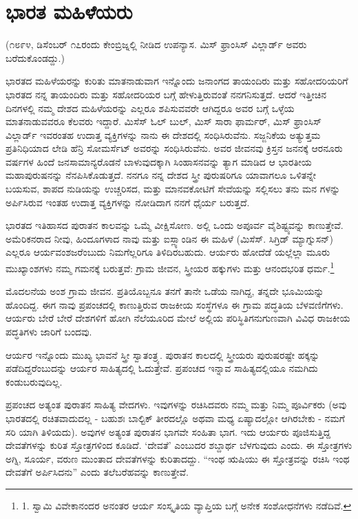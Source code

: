 
\chapter{ಭಾರತ ಮಹಿಳೆಯರು}

(೧೮೯೪, ಡಿಸೆಂಬರ್ ೧೭ರಂದು ಕೇಂಬ್ರಿಜ್ನಲ್ಲಿ ನೀಡಿದ ಉಪನ್ಯಾಸ. ಮಿಸ್ ಫ್ರಾಂಸಿಸ್ ವಿಲ್ಲಾರ್ಡ್ ಅವರು ಬರೆದುಕೊಂಡದ್ದು.)

ಭಾರತದ ಮಹಿಳೆಯರನ್ನು ಕುರಿತು ಮಾತನಾಡುವಾಗ ಇನ್ನೊಂದು ಜನಾಂಗದ ತಾಯಂದಿರು ಮತ್ತು ಸಹೋದರಿಯರಿಗೆ ಭಾರತದ ನನ್ನ ತಾಯಂದಿರು ಮತ್ತು ಸಹೋದರಿಯರ ಬಗ್ಗೆ ಹೇಳುತ್ತಿರುವಂತೆ ನನಗನಿಸುತ್ತದೆ. ಆದರೆ ಇತ್ತೀಚಿನ ದಿನಗಳಲ್ಲಿ ನಮ್ಮ ದೇಶದ ಮಹಿಳೆಯರನ್ನು ಎಲ್ಲರೂ ಶಪಿಸುವವರೇ ಆಗಿದ್ದರೂ ಅವರ ಬಗ್ಗೆ ಒಳ್ಳೆಯ ಮಾತನಾಡುವವರೂ ಕೆಲವರು ಇದ್ದಾರೆ. ಮಿಸೆಸ್ ಓಲ್ ಬುಲ್, ಮಿಸ್ ಸಾರಾ ಫಾರ್ಮರ್, ಮಿಸ್ ಫ್ರಾಂಸಿಸ್ ವಿಲ್ಲಾರ್ಡ್ ಇವರಂತಹ ಉದಾತ್ತ ವ್ಯಕ್ತಿಗಳನ್ನು ನಾನು ಈ ದೇಶದಲ್ಲಿ ಸಂಧಿಸಿರುವೆನು. ಸಜ್ಜನಿಕೆಯ ಅತ್ಯುತ್ತಮ ಪ್ರತಿನಿಧಿಯಾದ ಲೇಡಿ ಹೆನ್ರಿ ಸೋಮರ್ಸೆಟ್ ಅವರನ್ನು ಸಂಧಿಸಿರುವೆನು. ಅವರ ಜೀವನವು ಕ್ರಿಸ್ತನ ಜನನಕ್ಕೆ ಆರನೂರು ವರ್ಷಗಳ ಹಿಂದೆ ಜನಸಾಮಾನ್ಯರೊಡನೆ ಬಾಳುವುದಕ್ಕಾಗಿ ಸಿಂಹಾಸನವನ್ನು ತ್ಯಾಗ ಮಾಡಿದ ಆ ಭಾರತೀಯ ಮಹಾಪುರುಷನನ್ನು ನೆನಪಿಸಿಕೊಡುತ್ತದೆ. ನನಗೂ ನನ್ನ ದೇಶದ ಸ್ತ್ರೀ ಪುರುಷರಿಗೂ ಯಾವಾಗಲೂ ಒಳಿತನ್ನೇ ಬಯಸುವ, ಶಾಪದ ನುಡಿಯನ್ನು ಉಚ್ಚರಿಸದ, ಮತ್ತು ಮಾನವಕೋಟಿಗೆ ಸೇವೆಯನ್ನು ಸಲ್ಲಿಸಲು ತನು ಮನ ಗಳನ್ನು ಅರ್ಪಿಸಿರುವ ಇಂತಹ ಉದಾತ್ತ ವ್ಯಕ್ತಿಗಳನ್ನು ನೋಡಿದಾಗ ನನಗೆ ಧೈರ್ಯ ಬರುತ್ತದೆ.

ಭಾರತದ ಇತಿಹಾಸದ ಪುರಾತನ ಕಾಲವನ್ನು ಒಮ್ಮೆ ವೀಕ್ಷಿಸೋಣ. ಅಲ್ಲಿ ಒಂದು ಅಪೂರ್ವ ವೈಶಿಷ್ಟ್ಯವನ್ನು ಕಾಣುತ್ತೇವೆ. ಅಮೆರಿಕನರಾದ ನೀವು, ಹಿಂದೂಗಳಾದ ನಾವು ಮತ್ತು ಐಸ್ಲ್ಯಾಂಡಿನ ಈ ಮಹಿಳೆ (ಮಿಸೆಸ್. ಸಿಗ್ರಿಡ್ ಮ್ಯಾಗ್ನುಸನ್) ಎಲ್ಲರೂ ಆರ್ಯವಂಶಜರೆಂಬುದು ನಿಮಗೆಲ್ಲರಿಗೂ ತಿಳಿದಿರಬಹುದು. ಆರ್ಯರು ಹೋದೆಡೆ ಯಲ್ಲೆಲ್ಲಾ ಮೂರು ಮುಖ್ಯಾಂಶಗಳು ನಮ್ಮ ಗಮನಕ್ಕೆ ಬರುತ್ತವೆ: ಗ್ರಾಮ ಜೀವನ, ಸ್ತ್ರೀಯರ ಹಕ್ಕುಗಳು ಮತ್ತು ಆನಂದಭರಿತ ಧರ್ಮ.\footnote{1. ಸ್ವಾಮಿ ವಿವೇಕಾನಂದರ ಅನಂತರ ಆರ್ಯ ಸಂಸ್ಕೃತಿಯ ವ್ಯಾಪ್ತಿಯ ಬಗ್ಗೆ ಅನೇಕ ಸಂಶೋಧನೆಗಳು ನಡೆದಿವೆ.}

ಮೊದಲನೆಯ ಅಂಶ ಗ್ರಾಮ ಜೀವನ. ಪ್ರತಿಯೊಬ್ಬನೂ ತನಗೆ ತಾನೇ ಒಡೆಯ ನಾಗಿದ್ದ, ತನ್ನದೇ ಭೂಮಿಯನ್ನು ಹೊಂದಿದ್ದ. ಈಗ ನಾವು ಪ್ರಪಂಚದಲ್ಲಿ ಕಾಣುತ್ತಿರುವ ರಾಜಕೀಯ ಸಂಸ್ಥೆಗಳೂ ಈ ಗ್ರಾಮ ಪದ್ಧತಿಯ ಬೆಳವಣಿಗೆಗಳು. ಆರ್ಯರು ಬೇರೆ ಬೇರೆ ದೇಶಗಳಿಗೆ ಹೋಗಿ ನೆಲೆಯೂರಿದ ಮೇಲೆ ಅಲ್ಲಿಯ ಪರಿಸ್ಥಿತಿಗನುಗುಣವಾಗಿ ವಿವಿಧ ರಾಜಕೀಯ ಪದ್ಧತಿಗಳು ಜಾರಿಗೆ ಬಂದವು.

ಆರ್ಯರ ಇನ್ನೊಂದು ಮುಖ್ಯ ಭಾವನೆ ಸ್ತ್ರೀ ಸ್ವಾತಂತ್ರ್ಯ. ಪುರಾತನ ಕಾಲದಲ್ಲಿ ಸ್ತ್ರೀಯರು ಪುರುಷರಷ್ಟೇ ಹಕ್ಕನ್ನು ಪಡೆದಿದ್ದರೆಂಬುದನ್ನು ಆರ್ಯರ ಸಾಹಿತ್ಯದಲ್ಲಿ ಓದುತ್ತೇವೆ. ಪ್ರಪಂಚದ ಇನ್ನಾವ ಸಾಹಿತ್ಯದಲ್ಲಿಯೂ ನಮಗಿದು ಕಂಡುಬರುವುದಿಲ್ಲ.

ಪ್ರಪಂಚದ ಅತ್ಯಂತ ಪುರಾತನ ಸಾಹಿತ್ಯ ವೇದಗಳು. ಇವುಗಳನ್ನು ರಚಿಸಿದವರು ನಮ್ಮ ಮತ್ತು ನಿಮ್ಮ ಪೂರ್ವಿಕರು (ಅವು ಭಾರತದಲ್ಲಿ ರಚಿತವಾದುದಲ್ಲ - ಬಹುಶಃ ಬಾಲ್ಟಿಕ್ ತೀರದಲ್ಲೊ ಅಥವಾ ಮಧ್ಯ ಏಷ್ಯಾದಲ್ಲೋ ಆಗಿರಬೇಕು - ನಮಗೆ ಸರಿ ಯಾಗಿ ತಿಳಿಯದು). ಅವುಗಳ ಅತ್ಯಂತ ಪುರಾತನ ಭಾಗವೇ ಸಂಹಿತಾ ಭಾಗ. ಇದು ಆರ್ಯರು ಪೂಜಿಸುತ್ತಿದ್ದ ದೇವತೆಗಳನ್ನು ಕುರಿತ ಸ್ತೋತ್ರಗಳಿಂದ ಕೂಡಿದೆ. ‘ದೇವತೆ’ ಎಂಬುದರ ಶಬ್ದಾರ್ಥ ಬೆಳಗುವುದು ಎಂದು. ಈ ಸ್ತೋತ್ರಗಳು ಅಗ್ನಿ, ಸೂರ್ಯ, ವರುಣ ಮುಂತಾದ ದೇವತೆಗಳನ್ನು ಕುರಿತಾದದ್ದು. “ಇಂಥ ಋಷಿಯು ಈ ಸ್ತೋತ್ರವನ್ನು ರಚಿಸಿ ಇಂಥ ದೇವತೆಗೆ ಅರ್ಪಿಸಿದನು” ಎಂದು ತಲೆಬರೆಹವನ್ನು ಕಾಣುತ್ತೇವೆ.

